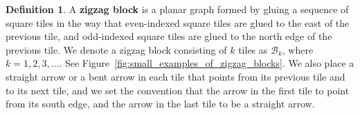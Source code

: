 \documentclass[11pt]{amsart}
\theoremstyle{definition}
\newtheorem{defn}[thm]{Definition}
\theoremstyle{remark}
\numberwithin{equation}{section}
\begin{document}
\begin{defn}
    A \textbf{zigzag block} is a planar graph formed by gluing a sequence of square tiles in the way that even-indexed square tiles are glued to the east of the previous tile, and odd-indexed square tiles are glued to the north edge of the previous tile. We denote a zigzag block consisting of $k$ tiles as $\mathcal{B}_k$, where $k=1,2,3,...$. See Figure~\ref{fig:small_examples_of_zigzag_blocks}. We also place a straight arrow or a bent arrow in each tile that points from its previous tile and to its next tile, and we set the convention that the arrow in the first tile to point from its south edge, and the arrow in the last tile to be a straight arrow.
\end{defn}

\end{document}
